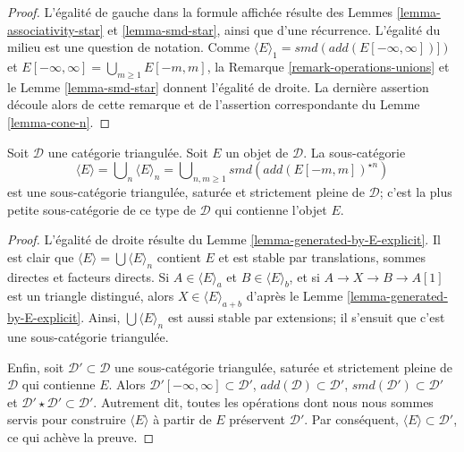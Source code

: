 \begin{proof}
L'égalité de gauche dans la formule affichée résulte des Lemmes
\ref{lemma-associativity-star} et \ref{lemma-smd-star}, ainsi que d'une
récurrence. L'égalité du milieu est une question de notation.
Comme $\langle E \rangle_1 = smd(add(E[-\infty, \infty])])$ et
$E[-\infty, \infty] = \bigcup_{m \geq 1} E[-m, m]$, la
Remarque \ref{remark-operations-unions} et le Lemme \ref{lemma-smd-star}
donnent l'égalité de droite. La dernière assertion découle alors de cette
remarque et de l'assertion correspondante du Lemme \ref{lemma-cone-n}.
\end{proof}

\begin{lemma}
\label{lemma-find-smallest-containing-E}
Soit $\mathcal{D}$ une catégorie triangulée. Soit $E$ un objet de
$\mathcal{D}$. La sous-catégorie
$$
\langle E \rangle = \bigcup\nolimits_n \langle E \rangle_n
= \bigcup\nolimits_{n, m \geq 1} smd(add(E[-m, m])^{\star n})
$$
est une sous-catégorie triangulée, saturée et strictement pleine de
$\mathcal{D}$; c'est la plus petite sous-catégorie de ce type de
$\mathcal{D}$ qui contienne l'objet $E$.
\end{lemma}

\begin{proof}
L'égalité de droite résulte du
Lemme \ref{lemma-generated-by-E-explicit}.
Il est clair que $\langle E \rangle = \bigcup \langle E \rangle_n$ contient
$E$ et est stable par translations, sommes directes et facteurs directs.
Si $A \in \langle E \rangle_a$ et $B \in \langle E \rangle_b$, et si
$A \to X \to B \to A[1]$ est un triangle distingué, alors
$X \in \langle E \rangle_{a + b}$ d'après le
Lemme \ref{lemma-generated-by-E-explicit}.
Ainsi, $\bigcup \langle E \rangle_n$ est aussi stable par extensions; il
s'ensuit que c'est une sous-catégorie triangulée.

\medskip\noindent
Enfin, soit $\mathcal{D}' \subset \mathcal{D}$ une sous-catégorie triangulée,
saturée et strictement pleine de $\mathcal{D}$ qui contienne $E$. Alors
$\mathcal{D}'[-\infty, \infty] \subset \mathcal{D}'$,
$add(\mathcal{D}) \subset \mathcal{D}'$,
$smd(\mathcal{D}') \subset \mathcal{D}'$ et
$\mathcal{D}' \star \mathcal{D}' \subset \mathcal{D}'$.
Autrement dit, toutes les opérations dont nous nous sommes servis pour
construire $\langle E \rangle$ à partir de $E$ préservent $\mathcal{D}'$.
Par conséquent, $\langle E \rangle \subset \mathcal{D}'$, ce qui achève la
preuve.
\end{proof}

